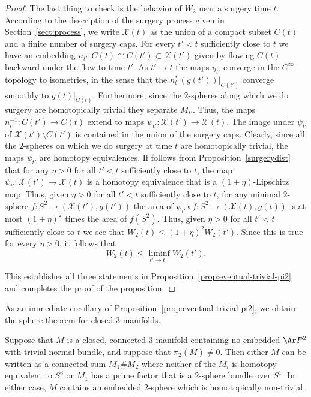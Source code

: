 \begin{proof}
The last thing to check is the behavior of $W_2$ near a surgery time
$t$. According to the description of the surgery process given in
Section~\ref{sect:process}, we write ${\mathcal X}(t)$ as the union
of a compact subset $C(t)$ and a finite number of surgery caps. For
every $t'<t$ sufficiently close to $t$ we have an embedding
$n_{t'}\colon C(t)\cong C(t')\subset {\mathcal X}(t')$ given by
flowing $C(t)$ backward under the flow to time $t'$. As
$t'\rightarrow t$ the maps $\eta_{t'}$ converge in the
$C^\infty$-topology to isometries, in the sense that the
$n_{t'}^*(g(t'))|_{C(t')}$ converge smoothly to $g(t)|_{C(t)}$.
Furthermore, since the $2$-spheres along which we do surgery are
homotopically trivial they separate $M_{t'}$. Thus, the maps
$n_{t'}^{-1}\colon C(t')\to C(t)$ extend to maps $\psi_{t'}\colon
{\mathcal X}(t')\to {\mathcal X}(t)$. The image under $\psi_{t'}$ of
${\mathcal X}(t')\setminus C(t')$ is contained in the union of the
surgery caps.  Clearly, since all the $2$-spheres on which we do
surgery at time $t$ are homotopically trivial, the maps $\psi_{t'}$
are homotopy equivalences. If follows from
Proposition~\ref{surgerydist} that for any $\eta>0$ for all $t'<t$
sufficiently close to $t$, the map $\psi_{t'}\colon {\mathcal
X}(t')\to {\mathcal X}(t)$ is a
 homotopy equivalence that is a $(1+\eta)$-Lipschitz map. Thus,
 given $\eta>0$ for all $t'<t$ sufficiently close to $t$,
 for any minimal $2$-sphere $f\colon S^2\to ({\mathcal X}(t'),g(t'))$ the area of
 $\psi_{t'}\circ f\colon S^2\to ({\mathcal X}(t),g(t))$ is at most $(1+\eta)^2$
 times the area of $f(S^2)$. Thus, given $\eta>0$ for all $t'<t$ sufficiently close to $t$
we see that $W_2(t)\le (1+\eta)^2W_2(t')$.
 Since this is true for every $\eta>0$, it follows that
 $$W_2(t)\le \liminf_{t'\rightarrow t^-}W_2(t').$$

This establishes all three statements in Proposition~\ref{prop:eventual-trivial-pi2} and
completes the proof of the proposition.
\end{proof}


As an immediate corollary of Proposition~\ref{prop:eventual-trivial-pi2}, we obtain the
sphere theorem for closed $3$-manifolds.

\begin{corollary}
\label{cor:sphere-theorem-no-rp2}
\label{spherethm}
Suppose that $M$ is a closed, connected $3$-manifold containing no
embedded $\Ar P^2$ with trivial normal bundle, and suppose that
$\pi_2(M)\not= 0$. Then either $M$ can be written as a connected sum
$M_1\# M_2$ where neither of the $M_i$ is homotopy equivalent to
$S^3$ or $M_1$ has a prime factor that is a $2$-sphere bundle over
$S^1$. In either case, $M$ contains an embedded $2$-sphere which is
homotopically non-trivial.
\end{corollary}

